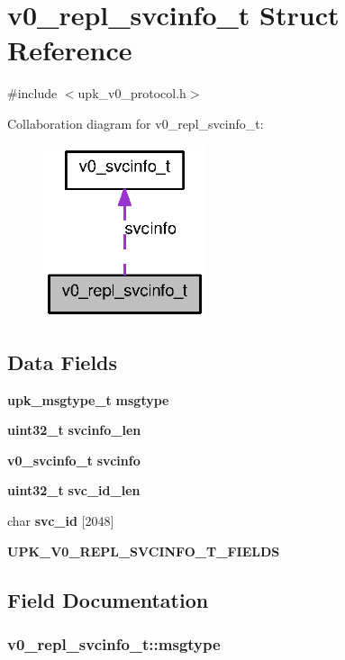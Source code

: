 \section{v0\_\-repl\_\-svcinfo\_\-t Struct Reference}
\label{structv0__repl__svcinfo__t}


{\ttfamily \#include $<$upk\_\-v0\_\-protocol.h$>$}



Collaboration diagram for v0\_\-repl\_\-svcinfo\_\-t:
\nopagebreak
\begin{figure}[H]
\begin{center}
\leavevmode
\includegraphics[width=136pt]{structv0__repl__svcinfo__t__coll__graph}
\end{center}
\end{figure}
\subsection*{Data Fields}
\begin{DoxyCompactItemize}
\item 
{\bf upk\_\-msgtype\_\-t} {\bf msgtype}
\item 
{\bf uint32\_\-t} {\bf svcinfo\_\-len}
\item 
{\bf v0\_\-svcinfo\_\-t} {\bf svcinfo}
\item 
{\bf uint32\_\-t} {\bf svc\_\-id\_\-len}
\item 
char {\bf svc\_\-id} [2048]
\item 
{\bf UPK\_\-V0\_\-REPL\_\-SVCINFO\_\-T\_\-FIELDS}
\end{DoxyCompactItemize}


\subsection{Field Documentation}
\subsubsection[{msgtype}]{ {\bf v0\_\-repl\_\-svcinfo\_\-t::msgtype}}\label{structv0__repl__svcinfo__t_a1542eeac32086b359de2113a19d1d542}
